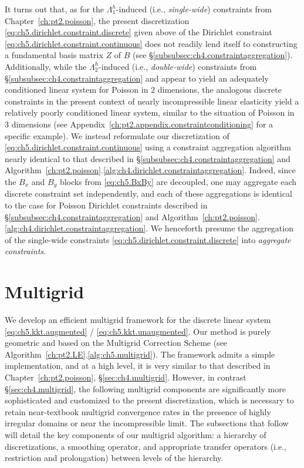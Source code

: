 It turns out that, as for the $\Lambda^h_1$-induced (i.e., \emph{single-wide}) constraints from Chapter~\ref{ch:pt2.poisson}, the present discretization \eqref{eq:ch5.dirichlet.constraint.discrete} given above of the Dirichlet constraint \eqref{eq:ch5.dirichlet.constraint.continuous} does not readily lend itself to constructing a fundamental basis matrix $Z$ of $B$ (see \S\ref{subsubsec:ch4.constraintaggregation}). Additionally, while the $\Lambda^h_2$-induced (i.e., \emph{double-wide}) constraints from \S\ref{subsubsec:ch4.constraintaggregation} and \cite{Bedrossian10} appear to yield an adequately conditioned linear system for Poisson in $2$ dimensions, the analogous discrete constraints in the present context of nearly incompressible linear elasticity yield a relatively poorly conditioned linear system, similar to the situation of Poisson in $3$ dimensions (see Appendix~\ref{ch:pt2.appendix.constraintconditioning} for a specific example). We instead reformulate our discretization of \eqref{eq:ch5.dirichlet.constraint.continuous} using a constraint aggregation algorithm nearly identical to that described in \S\ref{subsubsec:ch4.constraintaggregation} and Algorithm~\ref{ch:pt2.poisson}.\ref{alg:ch4.dirichlet.constraintaggregation}. Indeed, since the $B_x$ and $B_y$ blocks from \eqref{eq:ch5.BxBy} are decoupled, one may aggregate each discrete constraint set independently, and each of these aggregations is identical to the case for Poisson Dirichlet constraints described in \S\ref{subsubsec:ch4.constraintaggregation} and Algorithm~\ref{ch:pt2.poisson}.\ref{alg:ch4.dirichlet.constraintaggregation}. We henceforth presume the aggregation of the single-wide constraints \eqref{eq:ch5.dirichlet.constraint.discrete} into \emph{aggregate constraints}.

\section{Multigrid} \label{sec:ch5.multigrid}

We develop an efficient multigrid framework for the discrete linear system \eqref{eq:ch5.kkt.augmented} / \eqref{eq:ch5.kkt.unaugmented}. Our method is purely geometric and based on the Multigrid Correction Scheme (see Algorithm~\ref{ch:pt2.LE}.\ref{alg:ch5.multigrid}). The framework admits a simple implementation, and at a high level, it is very similar to that described in Chapter~\ref{ch:pt2.poisson}, \S\ref{sec:ch4.multigrid}. However, in contrast \S\ref{sec:ch4.multigrid}, the following multigrid components are significantly more sophisticated and customized to the present discretization, which is necessary to retain near-textbook multigrid convergence rates in the presence of highly irregular domains or near the incompressible limit. The subsections that follow will detail the key components of our multigrid algorithm: a hierarchy of discretizations, a smoothing operator, and appropriate transfer operators (i.e., restriction and prolongation) between levels of the hierarchy.

